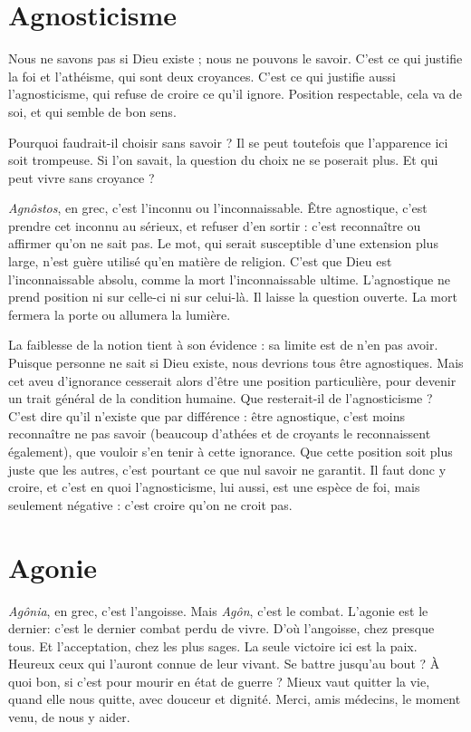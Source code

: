 \section{Agnosticisme}
Nous ne savons pas si Dieu existe ; nous ne pouvons le
savoir. C’est ce qui justifie la foi et l’athéisme, qui sont
deux croyances. C’est ce qui justifie aussi l'agnosticisme, qui refuse de croire ce
qu’il ignore. Position respectable, cela va de soi, et qui semble de bon sens.

Pourquoi faudrait-il choisir sans savoir ? Il se peut toutefois que l’apparence ici
soit trompeuse. Si l’on savait, la question du choix ne se poserait plus. Et qui
peut vivre sans croyance ?

{\it Agnôstos}, en grec, c’est l'inconnu ou l’inconnaissable. Être agnostique, c’est
prendre cet inconnu au sérieux, et refuser d’en sortir : c’est reconnaître ou
affirmer qu’on ne sait pas. Le mot, qui serait susceptible d’une extension plus
large, n’est guère utilisé qu’en matière de religion. C’est que Dieu est l’inconnaissable
absolu, comme la mort l’inconnaissable ultime. L’agnostique ne
prend position ni sur celle-ci ni sur celui-là. Il laisse la question ouverte. La
mort fermera la porte ou allumera la lumière.

La faiblesse de la notion tient à son évidence : sa limite est de n’en pas
avoir. Puisque personne ne sait si Dieu existe, nous devrions tous être agnostiques.
Mais cet aveu d’ignorance cesserait alors d’être une position particulière,
pour devenir un trait général de la condition humaine. Que resterait-il de
l’agnosticisme ? C’est dire qu’il n’existe que par différence : être agnostique,
c'est moins reconnaître ne pas savoir (beaucoup d’athées et de croyants le
reconnaissent également), que vouloir s’en tenir à cette ignorance. Que cette
position soit plus juste que les autres, c’est pourtant ce que nul savoir ne
garantit. Il faut donc y croire, et c’est en quoi l’agnosticisme, lui aussi, est une
espèce de foi, mais seulement négative : c’est croire qu’on ne croit pas.

\section{Agonie}
{\it Agônia}, en grec, c’est l’angoisse. Mais {\it Agôn}, c’est le combat. L’agonie
est le dernier: c’est le dernier combat perdu de vivre. D'où
l'angoisse, chez presque tous. Et l’acceptation, chez les plus sages. La seule victoire
ici est la paix. Heureux ceux qui l’auront connue de leur vivant. Se battre
jusqu’au bout ? À quoi bon, si c’est pour mourir en état de guerre ? Mieux vaut
quitter la vie, quand elle nous quitte, avec douceur et dignité. Merci, amis
médecins, le moment venu, de nous y aider.

